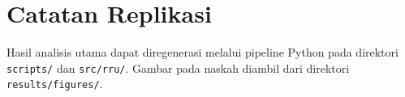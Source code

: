 \section{Catatan Replikasi}

Hasil analisis utama dapat diregenerasi melalui pipeline Python pada direktori \texttt{scripts/} dan \texttt{src/rru/}. Gambar pada naskah diambil dari direktori \texttt{results/figures/}.
